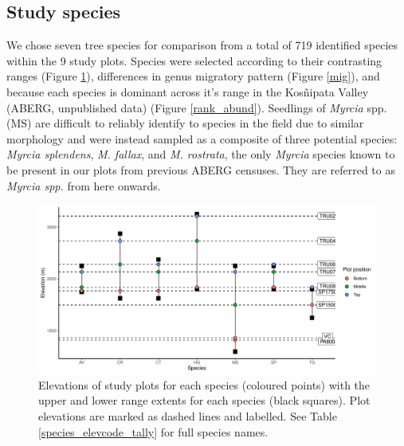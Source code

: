 \documentclass[a4paper, 11pt]{article}
\begin{document}
\subsection{Study species} 
We chose seven tree species for comparison from a total of 719 identified species within the 9 study plots. Species were selected according to their contrasting ranges (Figure \ref{ranges}), differences in genus migratory pattern \citep{Feeley2011} (Figure \ref{mig}), and because each species is dominant across it's range in the Kos\~{n}ipata Valley (ABERG, unpublished data) (Figure \ref{rank_abund}). Seedlings of \textit{Myrcia} spp. (MS) are difficult to reliably identify to species in the field due to similar morphology and were instead sampled as a composite of three potential species: \textit{Myrcia splendens}, \textit{M. fallax}, and \textit{M. rostrata}, the only \textit{Myrcia} species known to be present in our plots from previous ABERG censuses. They are referred to as \textit{Myrcia spp.} from here onwards. 


\begin{figure}[H]
\includegraphics[width=\textwidth]{ranges}
\centering
\caption{Elevations of study plots for each species (coloured points) with the upper and lower range extents for each species (black squares). Plot elevations are marked as dashed lines and labelled. See Table \ref{species_elevcode_tally} for full species names.}
\label{ranges}
\end{figure}
\end{document}
